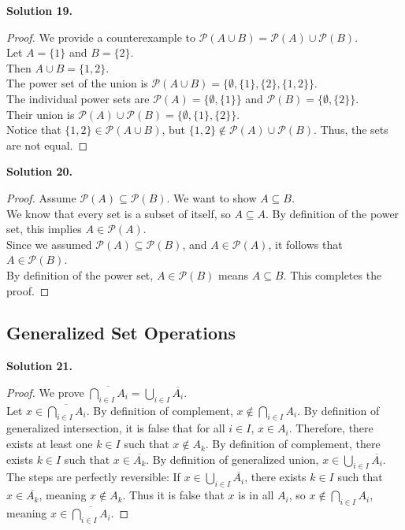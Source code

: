 \documentclass[11pt]{article}
\begin{document}
\noindent \textbf{Solution 19.}
\begin{proof}
We provide a counterexample to $\mathcal{P}(A \cup B) = \mathcal{P}(A) \cup \mathcal{P}(B)$. \\
Let $A = \{1\}$ and $B = \{2\}$. \\
Then $A \cup B = \{1, 2\}$. \\
The power set of the union is $\mathcal{P}(A \cup B) = \{\emptyset, \{1\}, \{2\}, \{1, 2\}\}$. \\
The individual power sets are $\mathcal{P}(A) = \{\emptyset, \{1\}\}$ and $\mathcal{P}(B) = \{\emptyset, \{2\}\}$. \\
Their union is $\mathcal{P}(A) \cup \mathcal{P}(B) = \{\emptyset, \{1\}, \{2\}\}$. \\
Notice that $\{1, 2\} \in \mathcal{P}(A \cup B)$, but $\{1, 2\} \notin \mathcal{P}(A) \cup \mathcal{P}(B)$. Thus, the sets are not equal.
\end{proof}

\noindent \textbf{Solution 20.}
\begin{proof}
Assume $\mathcal{P}(A) \subseteq \mathcal{P}(B)$. We want to show $A \subseteq B$. \\
We know that every set is a subset of itself, so $A \subseteq A$. By definition of the power set, this implies $A \in \mathcal{P}(A)$. \\
Since we assumed $\mathcal{P}(A) \subseteq \mathcal{P}(B)$, and $A \in \mathcal{P}(A)$, it follows that $A \in \mathcal{P}(B)$. \\
By definition of the power set, $A \in \mathcal{P}(B)$ means $A \subseteq B$. This completes the proof.
\end{proof}

\subsection{Generalized Set Operations}

\noindent \textbf{Solution 21.}
\begin{proof}
We prove $\overline{\bigcap_{i \in I} A_i} = \bigcup_{i \in I} \overline{A_i}$. \\
Let $x \in \overline{\bigcap_{i \in I} A_i}$. By definition of complement, $x \notin \bigcap_{i \in I} A_i$. By definition of generalized intersection, it is false that for all $i \in I$, $x \in A_i$. Therefore, there exists at least one $k \in I$ such that $x \notin A_k$. By definition of complement, there exists $k \in I$ such that $x \in \overline{A_k}$. By definition of generalized union, $x \in \bigcup_{i \in I} \overline{A_i}$. \\
The steps are perfectly reversible: If $x \in \bigcup_{i \in I} \overline{A_i}$, there exists $k \in I$ such that $x \in \overline{A_k}$, meaning $x \notin A_k$. Thus it is false that $x$ is in all $A_i$, so $x \notin \bigcap_{i \in I} A_i$, meaning $x \in \overline{\bigcap_{i \in I} A_i}$.
\end{proof}
\end{document}
